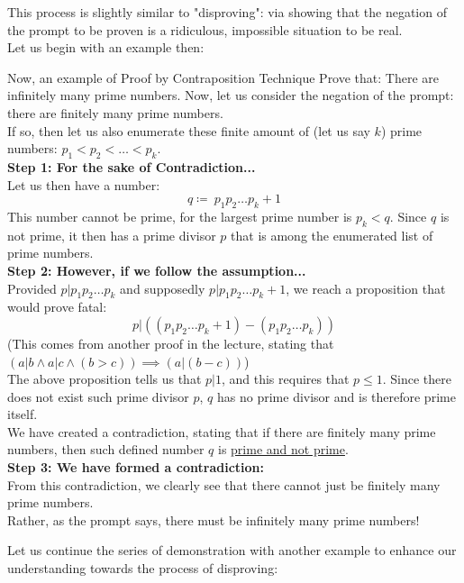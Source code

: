 This process is slightly similar to "disproving": via showing that the negation of the prompt to be proven is a ridiculous, impossible situation to be real. \\
Let us begin with an example then:
\begin{ln-think}{Now, an example of Proof by Contraposition Technique}{}
    Prove that: There are infinitely many prime numbers.
    \tcblower
    Now, let us consider the negation of the prompt: there are finitely many prime numbers. \\
    If so, then let us also enumerate these finite amount of (let us say $k$) prime numbers: $p_1 < p_2 < \dots < p_k$. \\
    \textbf{Step 1: For the sake of Contradiction...} \\
    Let us then have a number:
    \[q \coloneqq\ p_1p_2\dots p_k + 1\]
    This number cannot be prime, for the largest prime number is $p_k < q$. Since $q$ is not prime, it then has a prime divisor $p$ that is among the enumerated list of prime numbers. \\
    \textbf{Step 2: However, if we follow the assumption...} \\
    Provided $p|p_1p_2\dots p_k$ and supposedly $p|p_1p_2\dots p_k + 1$, we reach a proposition that would prove fatal:
    \[p|((p_1p_2\dots p_k + 1) - (p_1p_2\dots p_k))\]
    (This comes from another proof in the lecture, stating that $(a|b \land a|c \land (b > c)) \implies (a|(b-c))$) \\
    The above proposition tells us that $p|1$, and this requires that $p \leq 1$. Since there does not exist such prime divisor $p$, $q$ has no prime divisor and is therefore prime itself. \\
    We have created a contradiction, stating that if there are finitely many prime numbers, then such defined number $q$ is \underline{prime and not prime}. \\
    \textbf{Step 3: We have formed a contradiction:} \\
    From this contradiction, we clearly see that there cannot just be finitely many prime numbers. \\
    Rather, as the prompt says, there must be infinitely many prime numbers!
\end{ln-think}
Let us continue the series of demonstration with another example to enhance our understanding towards the process of disproving:
